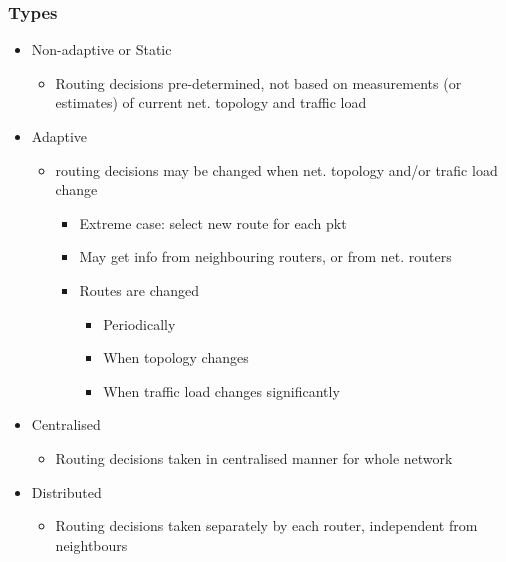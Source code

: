 \subsubsection{Types}
\begin{itemize}
	\item Non-adaptive or Static
	\begin{itemize}
		\item Routing decisions pre-determined, not based on
			measurements (or estimates) of current net. topology and
			traffic load
	\end{itemize}
	\item Adaptive
	\begin{itemize}
		\item routing decisions may be changed when net. topology and/or
			trafic load change
		\begin{itemize}
			\item Extreme case: select new route for each pkt
			\item May get info from neighbouring routers, or from
				net. routers
			\item Routes are changed
			\begin{itemize}
				\item Periodically
				\item When topology changes
				\item When traffic load changes significantly
			\end{itemize}
		\end{itemize}
	\end{itemize}
	\item Centralised
	\begin{itemize}
		\item Routing decisions taken in centralised manner for whole
			network
	\end{itemize}
	\item Distributed
	\begin{itemize}
		\item Routing decisions taken separately by each router,
			independent from neightbours
	\end{itemize}
\end{itemize}

